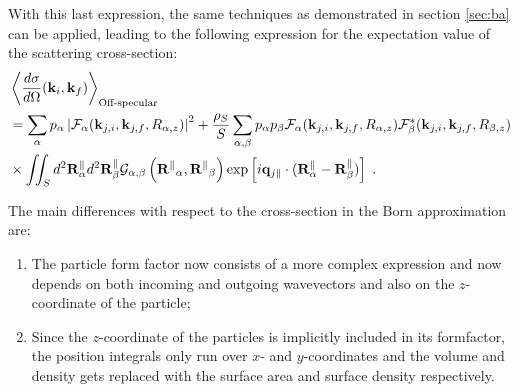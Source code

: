 With this last expression, the same techniques as demonstrated in section \ref{sec:ba} can be applied, leading to the following expression for the expectation value of the scattering cross-section:
\begin{align*}
  & \left\langle \frac{d\sigma}{d\Omega}(\mathbf{k}_i,\mathbf{k}_f) \right\rangle_{\text{Off-specular}}  \\
  & = \sum_\alpha p_\alpha \left\lvert \mathcal{F}_\alpha(\mathbf{k}_{j,i},\mathbf{k}_{j,f}, R_{\alpha,z})\right\rvert ^2 + \frac{\rho_S}{S}\sum_{\alpha,\beta} p_\alpha p_\beta \mathcal{F}_\alpha (\mathbf{k}_{j,i},\mathbf{k}_{j,f}, R_{\alpha,z})\mathcal{F}_\beta^*(\mathbf{k}_{j,i},\mathbf{k}_{j,f}, R_{\beta,z}) \\
  & \times \iint_S d^2\mathbf{R}_\alpha^\parallel d^2\mathbf{R}_\beta^\parallel \mathcal{G}_{\alpha ,\beta}\left( \mathbf{R^\parallel}_{\alpha} , \mathbf{R^\parallel}_{\beta} \right) \exp \left[ i\mathbf{q}_{j\parallel}\cdot (\mathbf{R}_\alpha^\parallel - \mathbf{R}_\beta^\parallel ) \right] \; .
\end{align*}

The main differences with respect to the cross-section in the Born approximation are:
\begin{enumerate}
  \item The particle form factor now consists of a more complex expression and now depends on both incoming and outgoing wavevectors and also on the $z$-coordinate of the particle;
  \item Since the $z$-coordinate of the particles is implicitly included in its formfactor, the position integrals only run over $x$- and $y$-coordinates and the volume and density gets replaced with the surface area and surface density respectively.
\end{enumerate}
